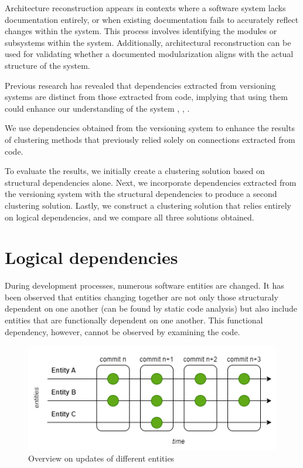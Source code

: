 \documentclass[conference]{IEEEtran}
\begin{document}
Architecture reconstruction appears in contexts where a software system lacks documentation entirely, or when existing documentation fails to accurately reflect changes within the system. This process involves identifying the modules or subsystems within the system. Additionally, architectural reconstruction can be used for validating whether a documented modularization aligns with the actual structure of the system.

Previous research has revealed that dependencies extracted from versioning systems are distinct from those extracted from code, implying that using them could enhance our understanding of the system \cite{DBLP:conf/issre/OlivaG15}, \cite{DBLP:journals/jss/AjienkaC17}, \cite{Oliva:2011:ISL:2067853.2068086}.

We use dependencies obtained from the versioning system to enhance the results of clustering methods that previously relied solely on connections extracted from code. 

To evaluate the results, we initially create a clustering solution based on structural dependencies alone. Next, we incorporate dependencies extracted from the versioning system with the structural dependencies to produce a second clustering solution. Lastly, we construct a clustering solution that relies entirely on logical dependencies, and we compare all three solutions obtained.


\section{Logical dependencies}
\label{ld_def}

During development processes, numerous software entities are changed. It has been observed that entities changing together are not only those structuraly dependent on one another (can be found by static code analysis) but also include entities that are functionally dependent on one another. This functional dependency, however, cannot be observed by examining the code.

\begin{figure}
\centering
\includegraphics[scale=0.6]{dependencies.png}
\caption{Overview on updates of different entities}
\label{fig:dependencies}
\centering
\end{figure}
\end{document}
